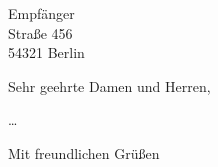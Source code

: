 \documentclass[parskip=half,%
fontsize=11pt,%
fromphone=true,%
fromemail=true
]{scrlttr2}
\begin{document}
\begin{letter}{\sffamily\large{
  Empfänger \\
  Straße 456 \\
  54321 Berlin
}}


\opening{Sehr geehrte Damen und Herren,}

\dots

\closing{Mit freundlichen Grüßen}


\end{letter}
\end{document}
